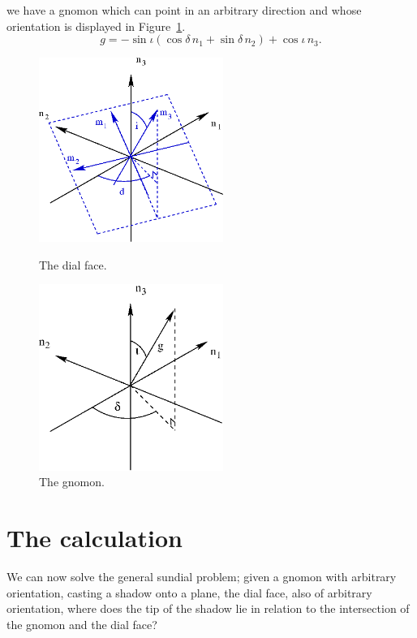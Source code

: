 \documentclass[12pt]{article}
\begin{document}
%
we have a gnomon which can point in an arbitrary direction and whose orientation is displayed in Figure~\ref{gnomonGeom}.
%
\begin{equation}\label{gnomon}
g = -\sin\iota(\cos\delta \, n_1 + \sin\delta \, n_2) +  \cos\iota \, n_3.
\end{equation}
%
\begin{figure}[ht!]
  \hfill
  \begin{minipage}[t]{.45\textwidth}
    \begin{center}  
	\includegraphics[width=6cm]{figs/figure3.eps}
      \caption{The dial face.\label{dialGeom}}
    \end{center}
  \end{minipage}
  \hfill
  \begin{minipage}[t]{.45\textwidth}
    \begin{center}  
      \includegraphics[width=6cm]{figs/figure4.eps}
      \caption{The gnomon.\label{gnomonGeom}}
    \end{center}
  \end{minipage}
  \hfill
\end{figure}
%
\section{The calculation} \label{mainCalc}
%
We can now solve the general sundial problem; given a gnomon with arbitrary orientation, casting a shadow onto a plane, the dial face, also of arbitrary orientation, where does the tip of the shadow lie in relation to the intersection of the gnomon and the dial face?
\end{document}
